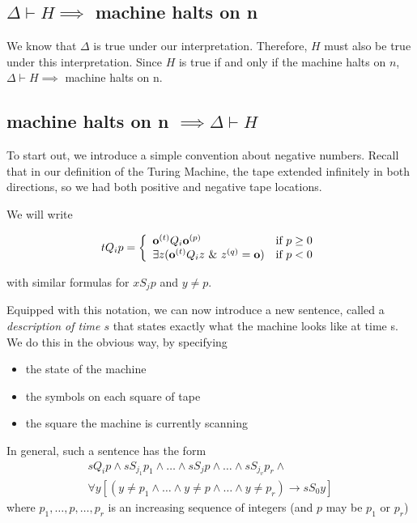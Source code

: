 \subsection{$\Delta \vdash H \implies$ machine halts on n}

We know that $\Delta$ is true under our interpretation.  Therefore, $H$ must also be true under this interpretation.
Since $H$ is true if and only if the machine halts on $n$, $\Delta \vdash H \implies$ machine halts on n.

\subsection{machine halts on n $\implies \Delta \vdash H$}

To start out, we introduce a simple convention about negative numbers. Recall that in our definition of the Turing Machine, the tape extended infinitely in both directions, so we had both positive and negative tape locations.

We will write 

\[tQ_ip = \left\{\begin{array}{ll}  \mathbf{o}^{(t)}Q_i\mathbf{o}^{(p)} & \text{if }p \ge 0 \\ 
 \exists z (\mathbf{o}^{(t)}Q_iz ~\&~ z^{(q)} = \mathbf{o}) & \text{if } p < 0 \end{array}\right.\]

with similar formulas for $xS_jp$ and $y \ne p$.

Equipped with this notation, we can now introduce a new sentence, called a \textit{description of time $s$} that states exactly what the machine looks like at time s. We do this in the obvious way, by specifying

\begin{itemize}
\item the state of the machine
\item the symbols on each square of tape
\item the square the machine is currently scanning
\end{itemize}

In general, such a sentence has the form
\begin{eqnarray*}
sQ_ip \land s S_{j_1} p_1 \land \dots\land s S_j p \land \dots \land s S_{j_v}p_r \land \\
\forall y[(y\ne p_1\land\dots\land y\ne p \land \dots \land y\ne p_r ) \rightarrow s S_0y]
\end{eqnarray*}
where $p_1, \dots , p, \dots, p_r$ is an increasing sequence of integers (and $p$ may be $p_1$ or $p_r$)

